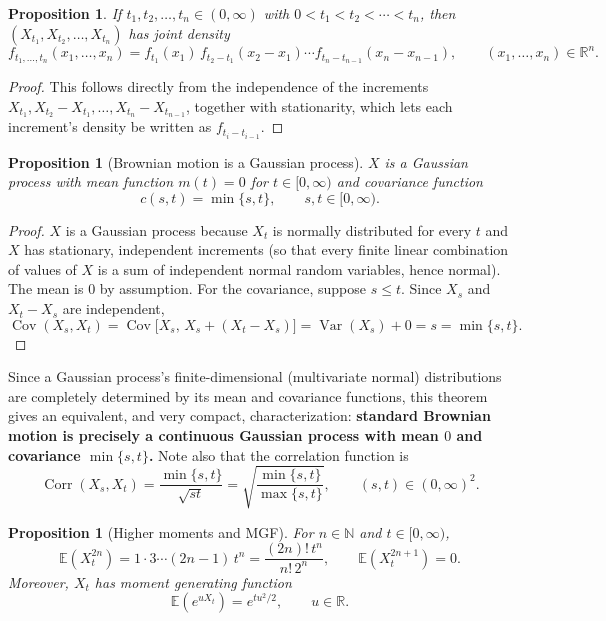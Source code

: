 \documentclass[12pt,openany]{book}
\newtheorem{proposition}[theorem]{Proposition}
\theoremstyle{definition}
\theoremstyle{remark}
\newcommand{\R}{\mathbb{R}}
\newcommand{\N}{\mathbb{N}}
\newcommand{\E}{\mathbb{E}}
\DeclareMathOperator{\Var}{Var}
\DeclareMathOperator{\Cov}{Cov}
\DeclareMathOperator{\cor}{Corr}
\begin{document}
\begin{proposition}
If $t_1, t_2, \dots, t_n \in (0,\infty)$ with $0 < t_1 < t_2 < \cdots < t_n$, then $(X_{t_1}, X_{t_2}, \dots, X_{t_n})$ has joint density
\begin{equation}
    f_{t_1,\dots,t_n}(x_1,\dots,x_n) = f_{t_1}(x_1)\, f_{t_2-t_1}(x_2-x_1) \cdots f_{t_n - t_{n-1}}(x_n - x_{n-1}), \qquad (x_1,\dots,x_n)\in\R^n. \tag{18.1.3}
\end{equation}
\end{proposition}
 
\begin{proof}
This follows directly from the independence of the increments $X_{t_1}, X_{t_2}-X_{t_1}, \dots, X_{t_n}-X_{t_{n-1}}$, together with stationarity, which lets each increment's density be written as $f_{t_i - t_{i-1}}$.
\end{proof}
 
\begin{proposition}[Brownian motion is a Gaussian process]
$X$ is a Gaussian process with mean function $m(t) = 0$ for $t \in [0,\infty)$ and covariance function
\[
    c(s,t) = \min\{s,t\}, \qquad s,t \in [0,\infty).
\]
\end{proposition}
 
\begin{proof}
$X$ is a Gaussian process because $X_t$ is normally distributed for every $t$ and $X$ has stationary, independent increments (so that every finite linear combination of values of $X$ is a sum of independent normal random variables, hence normal). The mean is $0$ by assumption. For the covariance, suppose $s \le t$. Since $X_s$ and $X_t - X_s$ are independent,
\[
    \Cov(X_s, X_t) = \Cov\big[X_s,\, X_s + (X_t - X_s)\big] = \Var(X_s) + 0 = s = \min\{s,t\}.
\]
\end{proof}
 
Since a Gaussian process's finite-dimensional (multivariate normal) distributions are completely determined by its mean and covariance functions, this theorem gives an equivalent, and very compact, characterization: \textbf{standard Brownian motion is precisely a continuous Gaussian process with mean $0$ and covariance $\min\{s,t\}$.} Note also that the correlation function is
\begin{equation}
    \cor(X_s, X_t) = \frac{\min\{s,t\}}{\sqrt{st}} = \sqrt{\frac{\min\{s,t\}}{\max\{s,t\}}}, \qquad (s,t) \in (0,\infty)^2. \tag{18.1.5}
\end{equation}
 
\begin{proposition}[Higher moments and MGF]
For $n \in \N$ and $t \in [0,\infty)$,
\[
    \E(X_t^{2n}) = 1 \cdot 3 \cdots (2n-1)\, t^n = \frac{(2n)!\, t^n}{n!\, 2^n}, \qquad \E(X_t^{2n+1}) = 0.
\]
Moreover, $X_t$ has moment generating function
\begin{equation}
    \E\!\left(e^{u X_t}\right) = e^{t u^2/2}, \qquad u \in \R. \tag{18.1.6}
\end{equation}
\end{proposition}
 
\end{document}

